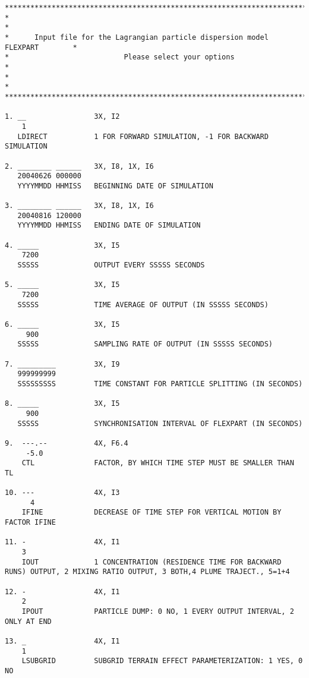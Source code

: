 \documentclass{egu}                  %
\begin{document}
\begin{scriptsize}\begin{verbatim}
********************************************************************************
*                                                                              *
*      Input file for the Lagrangian particle dispersion model FLEXPART        *
*                           Please select your options                         *
*                                                                              *
********************************************************************************

1. __                3X, I2
    1       
   LDIRECT           1 FOR FORWARD SIMULATION, -1 FOR BACKWARD SIMULATION

2. ________ ______   3X, I8, 1X, I6
   20040626 000000
   YYYYMMDD HHMISS   BEGINNING DATE OF SIMULATION

3. ________ ______   3X, I8, 1X, I6
   20040816 120000
   YYYYMMDD HHMISS   ENDING DATE OF SIMULATION

4. _____             3X, I5
    7200 
   SSSSS             OUTPUT EVERY SSSSS SECONDS

5. _____             3X, I5
    7200 
   SSSSS             TIME AVERAGE OF OUTPUT (IN SSSSS SECONDS)

6. _____             3X, I5
     900 
   SSSSS             SAMPLING RATE OF OUTPUT (IN SSSSS SECONDS)

7. _________         3X, I9
   999999999
   SSSSSSSSS         TIME CONSTANT FOR PARTICLE SPLITTING (IN SECONDS)

8. _____             3X, I5
     900 
   SSSSS             SYNCHRONISATION INTERVAL OF FLEXPART (IN SECONDS)

9.  ---.--           4X, F6.4
     -5.0
    CTL              FACTOR, BY WHICH TIME STEP MUST BE SMALLER THAN TL

10. ---              4X, I3
      4
    IFINE            DECREASE OF TIME STEP FOR VERTICAL MOTION BY FACTOR IFINE

11. -                4X, I1
    3  
    IOUT             1 CONCENTRATION (RESIDENCE TIME FOR BACKWARD RUNS) OUTPUT, 2 MIXING RATIO OUTPUT, 3 BOTH,4 PLUME TRAJECT., 5=1+4

12. -                4X, I1
    2  
    IPOUT            PARTICLE DUMP: 0 NO, 1 EVERY OUTPUT INTERVAL, 2 ONLY AT END

13. _                4X, I1
    1
    LSUBGRID         SUBGRID TERRAIN EFFECT PARAMETERIZATION: 1 YES, 0 NO


\end{verbatim}
\end{scriptsize}
\end{document}
